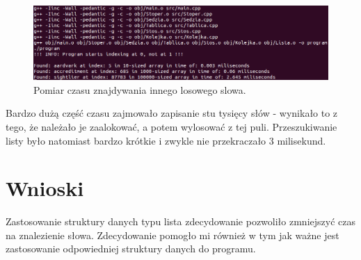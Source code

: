 \documentclass[11pt,a4paper]{article}
\begin{document}
\bigskip
\bigskip
\begin{figure}[h]
	\centering
		\includegraphics[scale=0.47]{../wykresy/Lista_znajdywanie2.png}
		\caption	{Pomiar czasu znajdywania innego losowego slowa.}	
\end{figure}
\bigskip

Bardzo dużą część czasu zajmowało zapisanie stu tysięcy słów - wynikało to z tego, że należało je zaalokować, a potem wylosować z tej puli. Przeszukiwanie listy było natomiast bardzo krótkie i zwykle nie przekraczało 3 milisekund.

\section{Wnioski}
Zastosowanie struktury danych typu lista zdecydowanie pozwoliło zmniejszyć czas na znalezienie słowa. Zdecydowanie pomogło mi również w tym jak ważne jest zastosowanie odpowiedniej struktury danych do programu.
\end{document}
